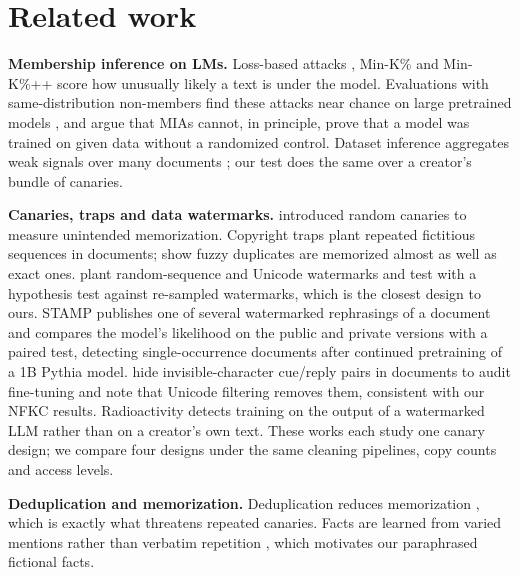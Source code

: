 \section{Related work}
\textbf{Membership inference on LMs.} Loss-based attacks \citep{carlini2021extracting}, Min-K\% \citep{shi2024detecting}
and Min-K\%++ \citep{zhang2025minkpp} score how unusually likely a text is under the model. Evaluations with
same-distribution non-members find these attacks near chance on large pretrained models
\citep{duan2024membership,das2024blind}, and \citet{zhang2024membership} argue that MIAs cannot, in principle,
prove that a model was trained on given data without a randomized control. Dataset inference aggregates weak
signals over many documents \citep{maini2024llm}; our test does the same over a creator's bundle of canaries.

\textbf{Canaries, traps and data watermarks.} \citet{carlini2019secret} introduced random canaries to measure
unintended memorization. Copyright traps \citep{meeus2024copyright} plant repeated fictitious sequences in
documents; \citet{shilov2024mosaic} show fuzzy duplicates are memorized almost as well as exact ones.
\citet{wei2024proving} plant random-sequence and Unicode watermarks and test with a hypothesis test against
re-sampled watermarks, which is the closest design to ours. STAMP \citep{rastogi2025stamp} publishes one of
several watermarked rephrasings of a document and compares the model's likelihood on the public and private
versions with a paired test, detecting single-occurrence documents after continued pretraining of a 1B Pythia model.
\citet{li2025provenance} hide invisible-character cue/reply pairs in documents to audit fine-tuning and note that
Unicode filtering removes them, consistent with our NFKC results. Radioactivity \citep{sander2024radioactive}
detects training on the output of a watermarked LLM rather than on a creator's own text. These works each study
one canary design; we compare four designs under the same cleaning pipelines, copy counts and access levels.

\textbf{Deduplication and memorization.} Deduplication reduces memorization \citep{lee2022deduplicating,kandpal2022deduplicating},
which is exactly what threatens repeated canaries. Facts are learned from varied mentions rather than verbatim
repetition \citep{allenzhu2023physics}, which motivates our paraphrased fictional facts.
